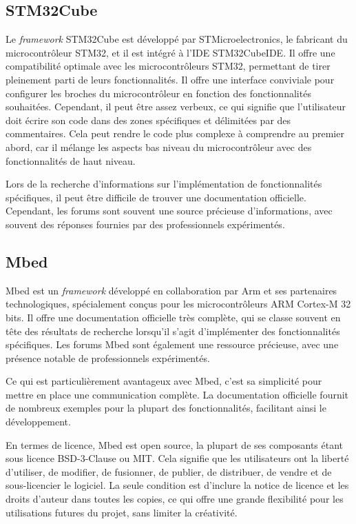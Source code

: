 \subsection{STM32Cube}

Le \textit{framework} STM32Cube est développé par STMicroelectronics, le fabricant du microcontrôleur STM32, et il est intégré à l'IDE STM32CubeIDE.
Il offre une compatibilité optimale avec les microcontrôleurs STM32, permettant de tirer pleinement parti de leurs fonctionnalités.
Il offre une interface conviviale pour configurer les broches du microcontrôleur en fonction des fonctionnalités souhaitées.
Cependant, il peut être assez verbeux, ce qui signifie que l'utilisateur doit écrire son code dans des zones spécifiques et délimitées par des commentaires.
Cela peut rendre le code plus complexe à comprendre au premier abord, car il mélange les aspects bas niveau du microcontrôleur avec des fonctionnalités de haut niveau.

Lors de la recherche d'informations sur l'implémentation de fonctionnalités spécifiques, il peut être difficile de trouver une documentation officielle.
Cependant, les forums sont souvent une source précieuse d'informations, avec souvent des réponses fournies par des professionnels expérimentés.

\subsection{Mbed}

Mbed est un \textit{framework} développé en collaboration par Arm et ses partenaires technologiques, spécialement conçus pour les microcontrôleurs ARM Cortex-M 32 bits.
Il offre une documentation officielle très complète, qui se classe souvent en tête des résultats de recherche lorsqu'il s'agit d'implémenter des fonctionnalités spécifiques.
Les forums Mbed sont également une ressource précieuse, avec une présence notable de professionnels expérimentés.

Ce qui est particulièrement avantageux avec Mbed, c'est sa simplicité pour mettre en place une communication complète.
La documentation officielle fournit de nombreux exemples pour la plupart des fonctionnalités, facilitant ainsi le développement.

En termes de licence, Mbed est open source, la plupart de ses composants étant sous licence BSD-3-Clause ou MIT.
Cela signifie que les utilisateurs ont la liberté d'utiliser, de modifier, de fusionner, de publier, de distribuer, de vendre et de sous-licencier le logiciel.
La seule condition est d'inclure la notice de licence et les droits d'auteur dans toutes les copies, ce qui offre une grande flexibilité pour les utilisations futures du projet, sans limiter la créativité.

